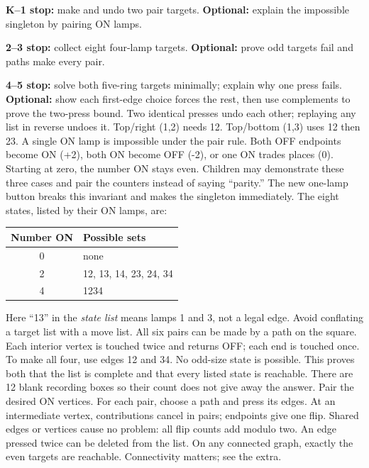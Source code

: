 \documentclass[12pt]{extarticle}
\begin{document}
\textbf{K--1 stop:} make and undo two pair targets. \textbf{Optional:} explain the impossible singleton by pairing ON lamps.\par
\textbf{2--3 stop:} collect eight four-lamp targets. \textbf{Optional:} prove odd targets fail and paths make every pair.\par
\textbf{4--5 stop:} solve both five-ring targets minimally; explain why one press fails. \textbf{Optional:} show each first-edge choice forces the rest, then use complements to prove the two-press bound.
\newpage
{}
Two identical presses undo each other; replaying any list in reverse undoes it. Top/right (1,2) needs 12. Top/bottom (1,3) uses 12 then 23. A single ON lamp is impossible under the pair rule. Both OFF endpoints become ON (+2), both ON become OFF (-2), or one ON trades places (0). Starting at zero, the number ON stays even. Children may demonstrate these three cases and pair the counters instead of saying ``parity.'' The new one-lamp button breaks this invariant and makes the singleton immediately.
The eight states, listed by their ON lamps, are:
\begin{center}\begin{tabular}{c|l}Number ON&Possible sets\\\hline 0&none\\2&12, 13, 14, 23, 24, 34\\4&1234\end{tabular}\end{center}
Here ``13'' in the \emph{state list} means lamps 1 and 3, not a legal edge. Avoid conflating a target list with a move list. All six pairs can be made by a path on the square. Each interior vertex is touched twice and returns OFF; each end is touched once. To make all four, use edges 12 and 34. No odd-size state is possible. This proves both that the list is complete and that every listed state is reachable. There are 12 blank recording boxes so their count does not give away the answer.
Pair the desired ON vertices. For each pair, choose a path and press its edges. At an intermediate vertex, contributions cancel in pairs; endpoints give one flip. Shared edges or vertices cause no problem: all flip counts add modulo two. An edge pressed twice can be deleted from the list. On any connected graph, exactly the even targets are reachable. Connectivity matters; see the extra.
\end{document}
